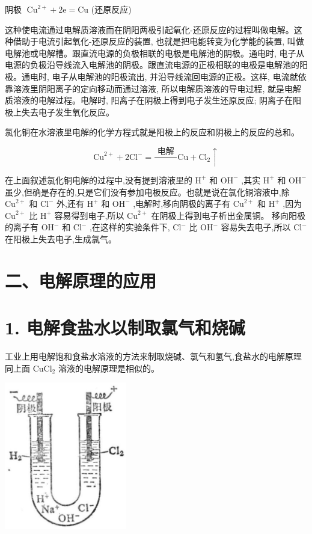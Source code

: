 \documentclass[10pt]{article}
\begin{document}
阴极 \(\;{\mathrm{{Cu}}}^{2 + } + 2\mathrm{e} = \mathrm{{Cu}}\) (还原反应)

这种使电流通过电解质溶液而在阴阳两极引起氧化-还原反应的过程叫做电解。这种借助于电流引起氧化-还原反应的装置, 也就是把电能转变为化学能的装置, 叫做电解池或电解槽。跟直流电源的负极相联的电极是电解池的阴极。通电时, 电子从电源的负极沿导线流入电解池的阴极。跟直流电源的正极相联的电极是电解池的阳极。通电时, 电子从电解池的阳极流出, 并沿导线流回电源的正极。这样, 电流就依靠溶液里阴阳离子的定向移动而通过溶液, 所以电解质溶液的导电过程, 就是电解质溶液的电解过程。电解时, 阳离子在阴极上得到电子发生还原反应; 阴离子在阳极上失去电子发生氧化反应。

氯化铜在水溶液里电解的化学方程式就是阳极上的反应和阴极上的反应的总和。

\[
{\mathrm{{Cu}}}^{2 + } + 2{\mathrm{{Cl}}}^{ - } = \frac{\text{ 电解 }}{}\mathrm{{Cu}} + {\mathrm{{Cl}}}_{2} \uparrow
\]

在上面叙述氯化铜电解的过程中,没有提到溶液里的 \({\mathrm{H}}^{ + }\) 和 \({\mathrm{{OH}}}^{ - }\) ,其实 \({\mathrm{H}}^{ + }\) 和 \({\mathrm{{OH}}}^{ - }\) 虽少,但确是存在的,只是它们没有参加电极反应。也就是说在氯化铜溶液中,除 \({\mathrm{{Cu}}}^{2 + }\) 和 \({\mathrm{{Cl}}}^{ - }\) 外,还有 \({\mathrm{H}}^{ + }\) 和 \({\mathrm{{OH}}}^{ - }\) ,电解时,移向阴极的离子有 \({\mathrm{{Cu}}}^{2 + }\) 和 \({\mathrm{H}}^{ + }\) ,因为 \({\mathrm{{Cu}}}^{2 + }\) 比 \({\mathrm{H}}^{ + }\) 容易得到电子,所以 \({\mathrm{{Cu}}}^{2 + }\) 在阴极上得到电子析出金属铜。 移向阳极的离子有 \({\mathrm{{OH}}}^{ - }\) 和 \({\mathrm{{Cl}}}^{ - }\) ,在这样的实验条件下, \({\mathrm{{Cl}}}^{ - }\) 比 \({\mathrm{{OH}}}^{ - }\) 容易失去电子,所以 \({\mathrm{{Cl}}}^{ - }\) 在阳极上失去电子,生成氯气。

\section*{二、电解原理的应用}

\section*{1. 电解食盐水以制取氯气和烧碱}

工业上用电解饱和食盐水溶液的方法来制取烧碱、氯气和氢气,食盐水的电解原理同上面 \({\mathrm{{CuCl}}}_{2}\) 溶液的电解原理是相似的。

\begin{center}
\includegraphics[max width=0.4\textwidth]{images/01912d13-9986-7822-a012-3f3f7be99dcb_169_667869.jpg}
\end{center}
\end{document}
